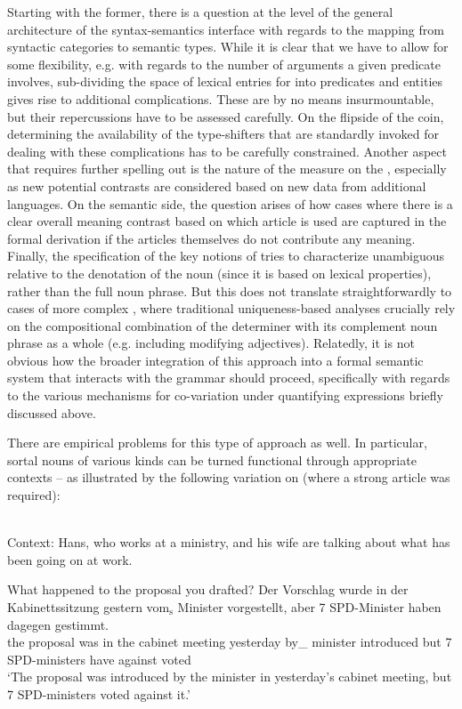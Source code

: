 \documentclass[output=paper
,modfonts
,nonflat]{langscibook}
\begin{document}
Starting with the former, there is a question at the level of the
general architecture of the syntax-semantics interface with regards to
the mapping from syntactic categories to semantic types. While it is
clear that we have to allow for some flexibility, e.g. with regards
to the number of arguments a given predicate involves, sub-dividing
the space of lexical entries for  into predicates and entities
gives rise to additional complications. These are by no means
insurmountable, but their repercussions have to be assessed carefully.
On the flipside of the coin, determining the availability of the
type-shifters that are standardly invoked for dealing with these
complications has to be carefully constrained. Another aspect that
requires further spelling out is the
nature of the measure on the , especially as new
potential contrasts are considered based on new data from additional
languages. On the semantic side, the question arises of how cases where there is a
clear overall meaning contrast based on which article is used are
captured in the formal derivation if the articles themselves do not
contribute any meaning. Finally, the specification of the key notions
of  tries to characterize unambiguous  relative to
the denotation of the noun (since it is based on lexical properties),
rather than the full noun phrase. But this does not translate straightforwardly to
cases of more complex , where traditional uniqueness-based
analyses crucially rely on the compositional combination of the
determiner with its complement noun phrase as a whole (e.g. including
modifying adjectives). Relatedly, it is
not obvious how the broader integration of this approach into a formal
semantic system that interacts with the grammar should proceed,
specifically with regards to the various mechanisms for co-variation
under quantifying expressions briefly discussed above. 

There are empirical problems for this type of approach as well. In particular,
sortal nouns of various kinds can be turned functional through
appropriate contexts -- as illustrated by the following variation on
 (where a strong article
was required):

\begin{exe}
\ex {} \\ Context: Hans, who works at a ministry, and his wife are talking about what has been going on at work.
\begin{xlist}
\ex What happened to the proposal you drafted?
\ex\gll Der Vorschlag wurde in der Kabinettssitzung gestern {vom$_\text{s}$} {Minister} vorgestellt, aber {7} {SPD-Minister} haben dagegen gestimmt.\label{minister1}\\
the proposal was in the {cabinet meeting} yesterday {by\_\theweak} minister introduced but 7 SPD-ministers have against voted\\
\glt `The proposal was introduced by the minister in yesterday's cabinet meeting, but 7 SPD-ministers voted against it.'
\end{xlist}
\end{exe}
\end{document}
